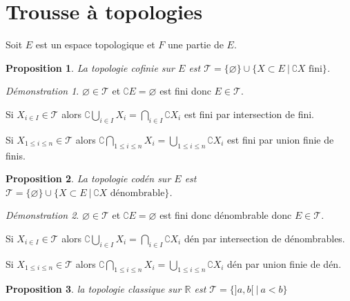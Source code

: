 \documentclass[a4paper, 11pt, french]{book}
\newenvironment{itemise}{\itemize}{\enditemize}
\theoremstyle{plain} %
\newtheorem{proposition}{Proposition}
\theoremstyle{definition} %
\theoremstyle{remark} %
\newtheorem*{demonstration}{Démonstration}
\newcommand{\1}{\mathds{1}}
\newcommand\vide{\varnothing}
\newcommand{\infegal}{\leqslant}
\newcommand{\R}{\mathbb{R}}
\newcommand\ens[2]{\{#1 \ |\ #2\}}
\begin{document}
\section{Trousse à topologies}

Soit $E$ est un espace topologique et $F$ une partie de $E$.

\begin{proposition}
	La topologie cofinie sur $E$ est $\mathscr{T}=\{\vide\}\cup\ens{X\subset E}{\complement X\text{ fini}}$.
\end{proposition}

\begin{demonstration}
	\begin{itemise}
		\item $\vide\in\mathscr{T}$ et $\complement E=\vide$ est fini donc $E\in\mathscr{T}$.
		\item Si $X_{i\in I}\in\mathscr{T}$ alors $\complement\bigcup_{i\in I}X_i=\bigcap_{i\in I}\complement X_i$ est fini par intersection de fini.
		\item Si $X_{1\infegal i\infegal n}\in\mathscr{T}$ alors $\complement\bigcap_{1\infegal i\infegal n}X_i=\bigcup_{1\infegal i\infegal n}\complement X_i$ est fini par union finie de finis.
	\end{itemise}
\end{demonstration}

\begin{proposition}
	La topologie codén sur $E$ est $\mathscr{T}=\{\vide\}\cup\ens{X\subset E}{\complement X\text{ dénombrable}}$.
\end{proposition}

\begin{demonstration}
	\begin{itemise}
		\item $\vide\in\mathscr{T}$ et $\complement E=\vide$ est fini donc dénombrable donc $E\in\mathscr{T}$.
		\item Si $X_{i\in I}\in\mathscr{T}$ alors $\complement\bigcup_{i\in I}X_i=\bigcap_{i\in I}\complement X_i$ dén par intersection de dénombrables.
		\item Si $X_{1\infegal i\infegal n}\in\mathscr{T}$ alors $\complement\bigcap_{1\infegal i\infegal n}X_i=\bigcup_{1\infegal i\infegal n}\complement X_i$ dén par union finie de dén.
	\end{itemise}
\end{demonstration}

\begin{proposition}
	la topologie classique sur $\R$ est $\mathscr{T}=\ens{]a, b[}{a<b}$
\end{proposition}
\end{document}
